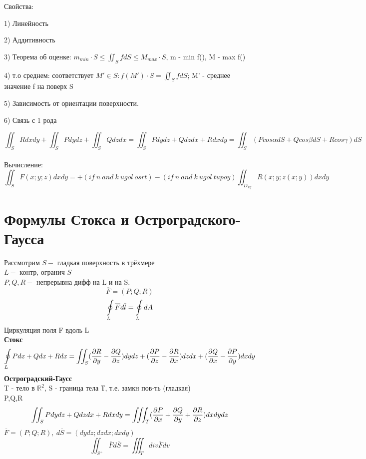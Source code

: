 \documentclass{article}
\begin{document}
Свойства:

1) Линейность

2) Аддитивность

3) Теорема об оценке: $m_{min} \cdot S \leq \iint_S fdS\leq M_{max}\cdot S$, m - min f(), M - max f()

4) т.о среднем: соответствует $M'\in S: f(M')\cdot S = \iint_S fdS$; M' - среднее значение f на поверх S

5) Зависимость от ориентации поверхности.

6) Связь с 1 рода 

\begin{equation*}
    \iint_S Rdxdy + \iint_S P dy dz +\iint_S Q dzdx = \iint_S Pdydz + Qdzdx +Rdxdy = \iint_S (Pcos\alpha dS + Qcos\beta dS + Rcos\gamma)dS
\end{equation*}
\\
Вычисление:
\begin{equation*}
    \iint_S F(x;y;z)dxdy = +(if\ n\ and \ k \ ugol\ osrt)-(if\ n\ and\ k\  ugol\ tupoy)\iint_{D_{xy}}R(x;y;z(x;y))dxdy 
\end{equation*}
\section{Формулы Стокса и Остроградского-Гаусса}
Рассмотрим $S - $ гладкая поверхность в трёхмере\\
$L - $ контр, огранич $S$\\
$P, Q, R - $ непрерывна дифф на L и на S.\\

\begin{equation*}
    \overline{F} = (P;Q;R)
\end{equation*}
\begin{equation*}
    \ointop_{L}\overline{F}d\overline{l} = \ointop_{L}dA
\end{equation*}
Циркуляция поля F вдоль L\\
\textbf{Стокс}
\begin{equation*}
    \ointop_L Pdx + Qdx + Rdx  = \iint_S (\pdv{R}{y}-\pdv{Q}{z})dydz+(\pdv{P}{z}-\pdv{R}{x})dzdx+(\pdv{Q}{x}-\pdv{P}{y})dxdy
\end{equation*}
\textbf{Остроградский-Гаусс}\\
T - тело в $\mathbb{R}^2$, S - граница тела Т, т.е. замкн пов-ть (гладкая)\\
P,Q,R 
\begin{equation*}
    \iint_S Pdydz +Qdzdx+ Rdxdy = \iiint_T (\pdv{P}{x}+\pdv{Q}{y}+\pdv{R}{z})dxdydz
\end{equation*}
$\overline{F} = (P;Q;R),\ d\overline{S} = (dydz;dzdx;dxdy)$
\begin{equation*}
    \iint_{S^+} \overline{F}d\overline{S} = \iiint_T div\overline{F}dv
\end{equation*}
    
\end{document}
